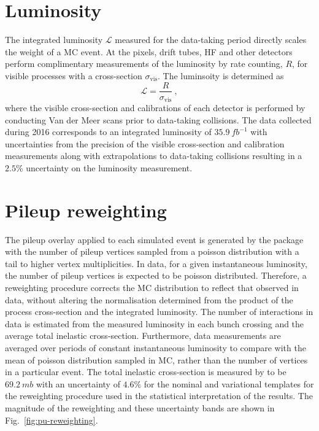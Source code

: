 \section{Luminosity}

The integrated luminosity $\mathcal{L}$ measured for the data-taking period
directly scales the weight of a MC event. At \CMS the pixels, drift tubes, HF
and other detectors perform complimentary measurements of the luminosity by
rate counting, $R$, for visible processes with a cross-section
$\sigma_{\mathrm{vis}}$. The luminsoity is determined as
%
\begin{equation}
    \mathcal{L} = \frac{R}{\sigma_{\mathrm{vis}}}\ ,
\end{equation}
%
where the visible cross-section and calibrations of each detector is performed
by conducting Van der Meer scans \cite{vanderMeer:296752} prior to data-taking
collisions. The data collected during 2016 corresponds to an integrated
luminosity of ${\SI{35.9}{fb^{-1}}}$ with uncertainties from the precision of
the visible cross-section and calibration measurements along with
extrapolations to data-taking collisions resulting in a $2.5\%$ uncertainty
\cite{CMS:2017sdi} on the luminosity measurement.


\section{Pileup reweighting}

The pileup overlay applied to each simulated event is generated by the \PYTHIA
package with the number of pileup vertices sampled from a poisson distribution
with a tail to higher vertex multiplicities. In data, for a given
instantaneous luminosity, the number of pileup vertices is expected to be
poisson distributed. Therefore, a reweighting procedure corrects the MC
distribution to reflect that observed in data, without altering the
normalisation determined from the product of the process cross-section and the
integrated luminosity. The number of interactions in data is estimated from
the measured luminosity in each bunch crossing and the average total inelastic
cross-section. Furthermore, data measurements are averaged over periods of
constant instantaneous luminosity to compare with the mean of poisson
distribution sampled in MC, rather than the number of vertices in a particular
event. The total inelastic cross-section is measured by \CMS to be
${\SI{69.2}{mb}}$ with an uncertainty of $4.6\%$ for the nominal and
variational templates for the reweighting procedure used in the statistical
interpretation of the results. The magnitude of the reweighting and these
uncertainty bands are shown in Fig.~\ref{fig:pu-reweighting}.

